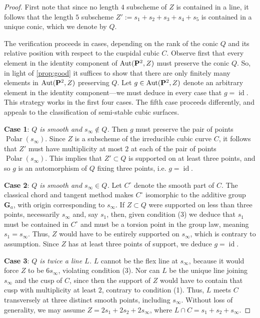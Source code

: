 \documentclass[12pt,reqno]{amsart}
\DeclareMathOperator{\id}{id}
\DeclareMathOperator{\Polar}{Polar}
\numberwithin{equation}{section}
\newcommand{\G}{\mathbf G}
\begin{document}
\begin{proof}
  First note that since no length $4$ subscheme of $Z$ is contained in
  a line, it follows that the length $5$ subscheme
  $Z' := s_1 + s_2 + s_3 +s_4 +s_5$ is contained in a unique conic,
  which we denote by $Q$.

  The verification proceeds in cases, depending on the rank of the
  conic $Q$ and its relative position with respect to the cuspidal
  cubic $C$.  Observe first that every element in the identity
  component of $\operatorname{Aut}({\bf P}^{2},Z)$ must preserve the conic $Q$. So, in
  light of \autoref{prop:good} it suffices to show that there are only
  finitely many elements in $\operatorname{Aut}({\bf P}^{2},Z)$ preserving $Q$.  Let
  $g \in \operatorname{Aut}({\bf P}^{2},Z)$ denote an arbitrary element in the identity
  component---we must deduce in every case that $g = \id$.  This
  strategy works in the first four cases. The fifth case proceeds
  differently, and appeals to the classification of semi-stable cubic
  surfaces.

  
  {\bf Case 1}: {\sl $Q$ is smooth and $s_{\infty} \notin Q$.}    Then
  $g$ must preserve the pair of points $\Polar(s_{\infty})$. Since $Z$
  is a subscheme of the irreducible cubic curve $C$, it follows that
  $Z'$ must have multiplicity at most $2$ at each of the pair of
  points $\Polar(s_{\infty})$.  This implies that $Z' \subset Q$ is
  supported on at least three points, and so $g$ is an automorphism of
  $Q$ fixing three points, i.e. $g = \id$.

  

  {\bf Case 2}: {\sl $Q$ is smooth and $s_{\infty} \in Q$.}  Let
  $C^{\circ}$ denote the smooth part of $C$. The classical chord and
  tangent method makes $C^{\circ}$ isomorphic to the additive group
  $\G_{a}$, with origin corresponding to $s_{\infty}$. If
  $Z \subset Q$ were supported on less than three points, necessarily
  $s_{\infty}$ and, say $s_{1}$, then, given condition (3) we deduce
  that $s_{1}$ must be contained in $C^{\circ}$ and must be a torsion
  point in the group law, meaning $s_{1} = s_{\infty}$. Thus, $Z$
  would have to be entirely supported on $s_{\infty}$, which is
  contrary to assumption.  Since $Z$ has at least three points of
  support, we deduce $g =\id$.

  
  {\bf Case 3}: {\sl $Q$ is twice a line $L$.} $L$ cannot be the flex
  line at $s_{\infty}$, because it would force $Z$ to be
  $6 s_{\infty}$, violating condition (3).  Nor can $L$ be the unique
  line joining $s_{\infty}$ and the cusp of $C$, since then the
  support of $Z$ would have to contain that cusp with multiplicity at
  least $2$, contrary to condition (1). Thus, $L$ meets $C$
  transversely at three distinct smooth points, including
  $s_{\infty}$.  Without loss of generality, we may assume
  $Z = 2s_1 + 2s_2 + 2s_{\infty}$, where
  $L \cap C = s_{1}+s_{2} + s_{\infty}$.


\end{proof}
\end{document}
